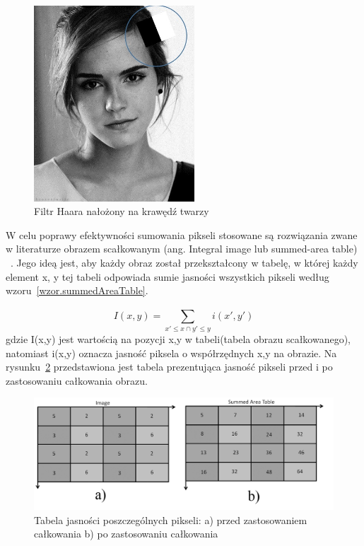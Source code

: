 \documentclass[a4paper,twoside,12pt]{book}
\begin{document}
    \begin{figure}
        \centering
        \includegraphics[width=6cm]{Obrazy/haarEmmaWatson.jpg}
        \caption{Filtr Haara nałożony na krawędź twarzy~\cite{haar}}
        \label{fig.haarEmmaWatson}
    \end{figure}

    W celu poprawy efektywności sumowania pikseli stosowane są
    rozwiązania zwane w literaturze obrazem scałkowanym (ang. Integral image lub summed-area table)
    ~\cite{computerVision}.
    Jego ideą jest, aby każdy obraz został przekształcony w
    tabelę, w której każdy element x, y tej tabeli odpowiada sumie jasności wszystkich pikseli według
    wzoru~\ref{wzor.summedAreaTable}.

    \large
    \begin{equation}
        I(x,y) = \sum_{{x}'\leq x \cap {y}'\leq y}^{} i({x}',{y}')
        \label{wzor.summedAreaTable}
    \end{equation}
    \normalsize
    gdzie I(x,y) jest wartością na pozycji x,y w tabeli(tabela obrazu scałkowanego), natomiast i(x,y) oznacza jasność piksela o
    współrzędnych x,y na obrazie.
    Na rysunku~\ref{fig.poiprzedCalkowaniem} przedstawiona jest tabela prezentująca jasność pikseli przed i po
    zastosowaniu całkowania obrazu.
    \begin{figure}
        \centering
        \includegraphics[width=12cm]{Obrazy/poiprzedCalkowaniem.jpg}
        \caption{Tabela jasności poszczególnych pikseli: a) przed zastosowaniem całkowania b) po
        zastosowaniu całkowania~\cite{integralImages}}
        \label{fig.poiprzedCalkowaniem}
    \end{figure}
\end{document}
